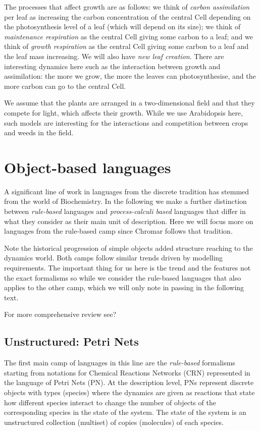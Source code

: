 \documentclass[phd]{infthesis}
\begin{document}
The processes that affect growth are as follows: we think of \textit{carbon
assimilation} per leaf as increasing the carbon concentration of the central
Cell depending on the photosynthesis level of a leaf (which will depend on its
size); we think of \textit{maintenance respiration} as the central Cell giving
some carbon to a leaf; and we think of \textit{growth respiration} as the
central Cell giving some carbon to a leaf and the leaf mass increasing. We will
also have \textit{new leaf creation}. There are interesting dynamics here such
as the interaction between growth and assimilation: the more we grow, the more
the leaves can photosynthesise, and the more carbon can go to the central Cell.

We assume that the plants are arranged in a two-dimensional field and that they
compete for light, which affects their growth. While we use Arabidopsis here,
such models are interesting for the interactions and competition between crops
and weeds in the field.




\section{Object-based languages}

A significant line of work in languages from the discrete tradition has stemmed
from the world of Biochemistry. In the following we make a further distinction
between \emph{rule-based} languages and \emph{process-calculi based} languages
that differ in what they consider as their main unit of description.
Here we will focus more on languages from the rule-based camp since Chromar follows that tradition. 


Note the historical progression of simple objects \textrightarrow added
structure \textright reaching to the dynamics world. Both camps follow similar
trends driven by modelling requirements. The important thing for us here is the
trend and the features not the exact formalisms so while we consider the
rule-based languages that also applies to the other camp, which we will only
note in passing in the following text.

For more comprehensive review see?


\subsection{Unstructured: Petri Nets}
The first main camp of languages in this line are the \emph{rule-based}
formalisms starting from notations for Chemical Reactions Networks (CRN)
represented in the language of Petri Nets (PN). At the description level, PNs
represent discrete objects with types (species) where the dynamics are given as
reactions that state how different species interact to change the number of
objects of the corresponding species in the state of the system. The state of
the system is an unstructured collection (multiset) of copies (molecules) of
each species.
\end{document}
